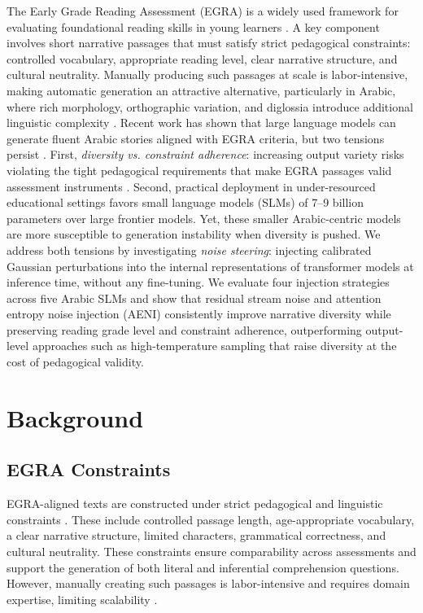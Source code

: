 \documentclass[11pt]{article}
\begin{document}
The Early Grade Reading Assessment (EGRA) is a widely used framework for evaluating foundational reading skills in young learners \cite{dubeck2015egra}. A key component involves short narrative passages that must satisfy strict pedagogical constraints: controlled vocabulary, appropriate reading level, clear narrative structure, and cultural neutrality. Manually producing such passages at scale is labor-intensive, making automatic generation an attractive alternative, particularly in Arabic, where rich morphology, orthographic variation, and diglossia introduce additional linguistic complexity \cite{habash2010introduction}.
Recent work has shown that large language models can generate fluent Arabic stories aligned with EGRA criteria, but two tensions persist \cite{abdelghafur2025tales,rai2024measuring}. First, \textit{diversity vs. constraint adherence}: increasing output variety risks violating the tight pedagogical requirements that make EGRA passages valid assessment instruments \cite{holtzman2020curious}. Second, practical deployment in under-resourced educational settings favors small language models (SLMs) of 7–9 billion parameters over large frontier models. Yet, these smaller Arabic-centric models are more susceptible to generation instability when diversity is pushed.
We address both tensions by investigating \textit{noise steering}: injecting calibrated Gaussian perturbations into the internal representations of transformer models at inference time, without any fine-tuning. We evaluate four injection strategies across five Arabic SLMs and show that residual stream noise and attention entropy noise injection (AENI) consistently improve narrative diversity while preserving reading grade level and constraint adherence, outperforming output-level approaches such as high-temperature sampling that raise diversity at the cost of pedagogical validity.

\section{Background}

\subsection{EGRA Constraints}

EGRA-aligned texts are constructed under strict pedagogical and linguistic constraints \cite{dubeck2015egra}. These include controlled passage length, age-appropriate vocabulary, a clear narrative structure, limited characters, grammatical correctness, and cultural neutrality. These constraints ensure comparability across assessments and support the generation of both literal and inferential comprehension questions. However, manually creating such passages is labor-intensive and requires domain expertise, limiting scalability \cite{abdelghafur2025tales}.
\end{document}
